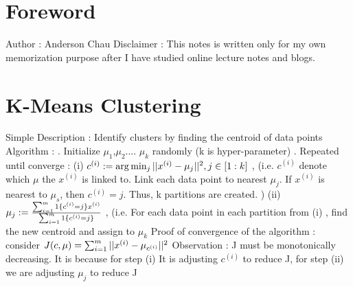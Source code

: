 \documentclass{article}
\begin{document}
\section{Foreword}
Author : Anderson Chau
\newline 
\newline 
Disclaimer : This notes is written only for my own memorization purpose after I have studied online lecture notes and blogs. 
\section{K-Means Clustering}
Simple Description : Identify clusters by finding the centroid of data points
\newline
\newline
Algorithm :  
\newline
{}. Initialize \( \mu_1 \),\( \mu_2 \).... \( \mu_k \) randomly (k is hyper-parameter) 
\newline
{}. Repeated until converge : 
\newline
\newline
(i) \( $$c^{(i)} := \arg \min_j ||x^{(i)} - \mu_j||^2$$ , j \in [1:k]\) , (i.e. \(c^{(i)}\) denote which  \( \mu \)  the \(x^{(i)}\) is linked to. Link each data point to nearest  \( \mu_j \). If \( x^{(i)}\) is nearest to \( \mu_s \), then \(c^{(i)} = j\). Thus, k partitions are created.  )
\newline
\newline
(ii) \($$\mu_j := \frac{\sum_{i=1}^m 1\{{c^{(i)} = j}\} x^{(i)}}{\sum_{i=1}^m 1\{{c^{(i)} = j}\}}$$\) , (i.e. For each data point in each partition from (i) , find the new centroid and assign to \(\mu_k\)
\newline
\newline 
Proof of convergence of the algorithm : consider 
\newline 
\newline 
\( $$J(c, \mu) = \sum_{i=1}^m ||x^{(i)} - \mu_{c^{(i)}}||^2$$\)
\newline 
Observation : J must be monotonically decreasing. It is because for step (i) It is adjusting \(c^(i)\) to reduce J, for step (ii) we are adjusting  \(\mu_j\) to reduce J
\end{document}
